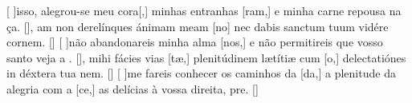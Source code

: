 {    {[ ]{is}so, alegrou-se meu cora[,] minhas entranhas [ram,] e minha carne repousa na \-ça. [\LinkPT]},
  {am non derelínques ánimam meam [\-no] nec dabis sanctum tuum vidére cor\-nem. [\LinkLA]}%
    {[ ]{não} abandonareis minha alma [nos,] e não permitireis que vosso santo veja a . [\LinkPT]},
  { mihi fácies vias [tæ,] plenitúdinem lætítiæ cum [o,] delectatiónes in déxtera tua nem. [\LinkLA]}%
    {[ ]{me} fareis conhecer os caminhos da [da,] a plenitude da alegria com a [ce,] as delícias à vossa direita, pre. [\LinkPT]}
}